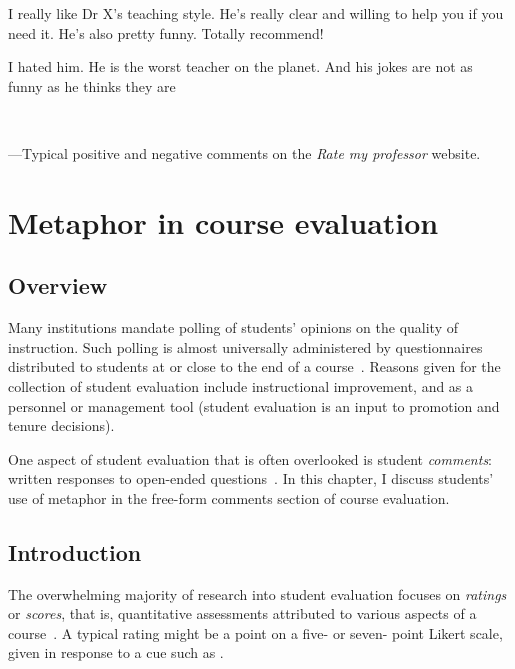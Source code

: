 \begin{singlespace}
\begin{savequote}[105mm]
  \begin{minipage}[t]{.45\textwidth}\raggedright
    I really like Dr X's teaching style.  He's really clear and
willing to help you if you need it.  He's also pretty funny.  Totally
recommend!\end{minipage}\hfill\begin{minipage}[t]{.45\textwidth}\raggedright
    I hated him.  He is the worst teacher on the planet.
And his jokes are not as funny as he thinks they are
\end{minipage}\\ \rule{0mm}{8mm}---Typical
positive and negative comments on the \emph{Rate my professor}
website.
\end{savequote}
\end{singlespace}

\chapter{Metaphor in course evaluation}
\label{chapter7}

\section{Overview}

Many institutions mandate polling of students' opinions on the quality
of instruction.  Such polling is almost universally administered by
questionnaires distributed to students at or close to the end of a
course~\citep{wachtel1998}.  Reasons given for the collection of
student evaluation include instructional improvement, and as a
personnel or management tool (student evaluation is an input to
promotion and tenure decisions).

One aspect of student evaluation that is often overlooked is student
\emph{comments}: written responses to open-ended
questions~\citep{stewart2015}.  In this chapter, I discuss students'
use of metaphor in the free-form comments section of course
evaluation.

\section{Introduction}
The overwhelming majority of research into student evaluation focuses
on \emph{ratings} or \emph{scores}, that is, quantitative assessments
attributed to various aspects of a course~\citep{stewart2015}.  A
typical rating might be a point on a five- or seven- point Likert
scale, given in response to a cue such as .

